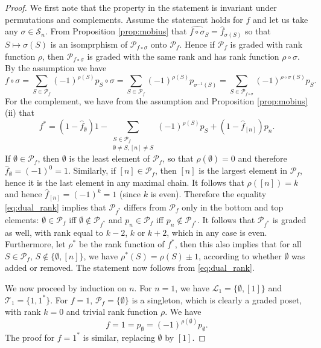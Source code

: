 \documentclass[12pt]{article}
\theoremstyle{definition}
\theoremstyle{remark}
\def\Te{\mathcal T}
\def\Pe{\mathcal P}
\def\permut{\mathscr{S}}
\begin{document}
\begin{proof} 
We first note that the property in the statement is invariant under permutations and
complements. Assume  the statement holds for $f$ and let us take any $\sigma\in \permut_n$.
From Proposition \ref{prop:mobius} that 
$\widehat{f\circ \sigma}_S=\hat f_{\sigma(S)}$ so that $S\mapsto \sigma(S)$ is an
isomprphism  of  
$\mathcal P_{f\circ \sigma}$ onto $\mathcal P_{f}$. Hence if $\Pe_f$ is graded with rank
function $\rho$, then $\Pe_{f\circ\sigma}$ is graded with the same rank and has rank function
$\rho\circ \sigma$. By the assumption we have 
\[
f\circ\sigma=\sum_{S\in \Pe_f}(-1)^{\rho(S)}p_S\circ\sigma=\sum_{S\in
\Pe_f}(-1)^{\rho(S)}p_{\sigma^{-1}(S)}=\sum_{S\in
\Pe_{f\circ\sigma}}(-1)^{\rho\circ \sigma(S)}p_{S}.
\]
For the complement, we have from the assumption and Proposition \ref{prop:mobius}(ii) that
\begin{equation}\label{eq:dual_rank}
f^*=(1-\hat f_\emptyset)1 -\sum_{\substack{S\in \mathcal P_f\\ \emptyset \ne S,
[n]\ne S}}
(-1)^{\rho(S)}p_S+(1- \hat f_{[n]})p_n.
\end{equation}
If $\emptyset \in \Pe_f$, then $\emptyset$ is the least element of $\Pe_f$, so that 
$\rho(\emptyset)=0$ and therefore $\hat f_\emptyset =
(-1)^0=1$. Similarly, if $[n]\in \Pe_f$, then $[n]$ is the largest element in $\Pe_f$,
hence it is the last element in any maximal chain. It follows that $\rho([n])=k$ and hence
$\hat f_{[n]}=(-1)^k=1$ (since $k$ is even). 
Therefore the equality \eqref{eq:dual_rank} implies that $\mathcal P_{f^*}$ differs from $\mathcal P_f$ only in the bottom  and
top elements:  $\emptyset \in \mathcal P_f$ iff  $\emptyset \notin \mathcal P_{f^*}$
and $p_n \in \mathcal P_f$ iff  $p_n \notin \mathcal P_{f^*}$. It follows that $\mathcal
P_{f^*}$ is graded as well, with rank  equal to $k-2$, $k$ or $k+2$, which in any case
is even. Furthermore, let $\rho^*$ be the rank function of $f^*$, then this also implies 
that for all $S\in \Pe_f$, $S\notin \{\emptyset, [n]\}$, we
have  $\rho^*(S)=\rho(S)\pm 1$, according to whether $\emptyset$ was added or removed. The
statement now follows from \eqref{eq:dual_rank}. 

We now proceed by induction on $n$. For $n=1$, we have $\mathcal L_1=\{\emptyset, [1]\}$ and
$\Te_1=\{1,1^*\}$. For $f=1$, $\mathcal P_f=\{\emptyset\}$ is a singleton, which 
is clearly a graded poset, with rank $k=0$ and trivial rank function $\rho$.  We have
\[
f = 1=p_\emptyset=(-1)^{\rho(\emptyset)}p_\emptyset.
\]
The proof for $f=1^*$ is similar, replacing $\emptyset$ by $[1]$.


\end{proof}
\end{document}
